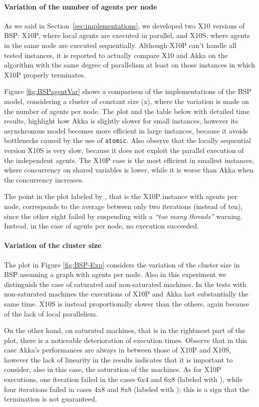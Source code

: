 \documentclass[a4paper]{article}
\numberwithin{equation}{section}
\begin{document}
\paragraph{Variation of the number of agents per node}
As we said in Section~\ref{sec:implementations}, we developed two X10
versions of BSP: X10P, where local agents are executed in parallel,
and X10S, where agents in the same node are executed sequentially. 
Although X10P can't handle all tested instances, it is reported to
actually compare X10 and Akka on the algorithm with the same degree
of parallelism at least on those instances in which X10P properly
terminates. 



Figure \ref{fig:BSPagentVar} shows a comparison of the
implementations of the BSP model, considering a cluster of constant
size (x), where the variation is made on the number of agents
per node. 
The plot and the table below with detailed time results, highlight how
Akka is slightly slower for small instances,
however its asynchronous model becomes more efficient in large
instances, because it avoids bottlenecks caused by the use of
\verb+atomic+. 
Also observe that the locally sequential version X10S is very slow, because
it does not exploit the parallel execution of the independent agents. 
The X10P case is the most efficient in smallest instances, where
concurrency on shared variables is lower, while it is worse than Akka
when the concurrency increases. 

The point in the plot labeled by , that is the X10P instance with
 agents per node, corresponds to the average
between only two iterations (instead of ten), since the other eight
failed by suspending with a \emph{``too many threads''} warning. 
Instead, in the case of  agents per node, no execution
succeeded. 




\paragraph{Variation of the cluster size}The  plot in Figure \ref{fig:BSP-Exp} considers the variation 
of the cluster size in BSP assuming a graph with  agents 
per node. Also in this experiment we distinguish the case of 
saturated and non-saturated machines.
In the tests with non-saturated machines the
executions of X10P and Akka last substantially the same time. 
X10S is instead proportionally slower than the others, again because 
of the lack of local parallelism.

On the other hand, on saturated machines, that is in the rightmost
part 
of the plot, there is a noticeable deterioration of execution times.
Observe that in this case Akka's performances are always in between
those of X10P and X10S, however the lack of linearity in the
results indicates that it is important to consider, also in this case,
the saturation of the machines.
As for X10P executions, one iteration failed in the cases 
6x4 and 6x8 (labeled with ), while four iterations 
failed in cases 4x8 and 8x8 (labeled with ); this 
is a sign that the termination is not guaranteed.
\end{document}
